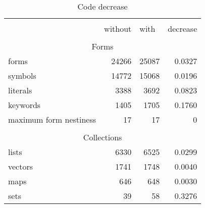 \begin{table}[]
\centering
\caption{Code decrease}
\label{}
\begin{tabular}{lrrr}
                                                   & \multicolumn{1}{l}{}         & \multicolumn{1}{l}{}       & \multicolumn{1}{l}{}          \\ \cline{2-4}
\multicolumn{1}{l|}{}                              & \multicolumn{1}{l|}{without} & \multicolumn{1}{l|}{with}  & \multicolumn{1}{l|}{decrease} \\ \cline{2-4}


                                                   & \multicolumn{1}{l}{}         & \multicolumn{1}{l}{}       & \multicolumn{1}{l}{}          \\
\multicolumn{4}{c}{Forms}                                                                                                                      \\ \hline
\multicolumn{1}{|l|}{forms}                        & \multicolumn{1}{r|}{24266}   & \multicolumn{1}{r|}{25087} & \multicolumn{1}{r|}{0.0327}   \\ \hline
\multicolumn{1}{|l|}{symbols}                      & \multicolumn{1}{r|}{14772}   & \multicolumn{1}{r|}{15068} & \multicolumn{1}{r|}{0.0196}   \\ \hline
\multicolumn{1}{|l|}{literals}                     & \multicolumn{1}{r|}{3388}    & \multicolumn{1}{r|}{3692}  & \multicolumn{1}{r|}{0.0823}   \\ \hline
\multicolumn{1}{|l|}{keywords}                     & \multicolumn{1}{r|}{1405}    & \multicolumn{1}{r|}{1705}  & \multicolumn{1}{r|}{0.1760}    \\ \hline
\multicolumn{1}{|l|}{maximum form nestiness}       & \multicolumn{1}{r|}{17}      & \multicolumn{1}{r|}{17}    & \multicolumn{1}{r|}{0}        \\ \hline

                                                   & \multicolumn{1}{l}{}         & \multicolumn{1}{l}{}       & \multicolumn{1}{l}{}          \\
\multicolumn{4}{c}{Collections}                                                                                                                \\ \hline
\multicolumn{1}{|l|}{lists}                        & \multicolumn{1}{r|}{6330}    & \multicolumn{1}{r|}{6525}  & \multicolumn{1}{r|}{0.0299}   \\ \hline
\multicolumn{1}{|l|}{vectors}                      & \multicolumn{1}{r|}{1741}    & \multicolumn{1}{r|}{1748}  & \multicolumn{1}{r|}{0.0040}    \\ \hline
\multicolumn{1}{|l|}{maps}                         & \multicolumn{1}{r|}{646}     & \multicolumn{1}{r|}{648}   & \multicolumn{1}{r|}{0.0030}    \\ \hline
\multicolumn{1}{|l|}{sets}                         & \multicolumn{1}{r|}{39}      & \multicolumn{1}{r|}{58}    & \multicolumn{1}{r|}{0.3276}   \\ \hline



\end{tabular}
\end{table}
